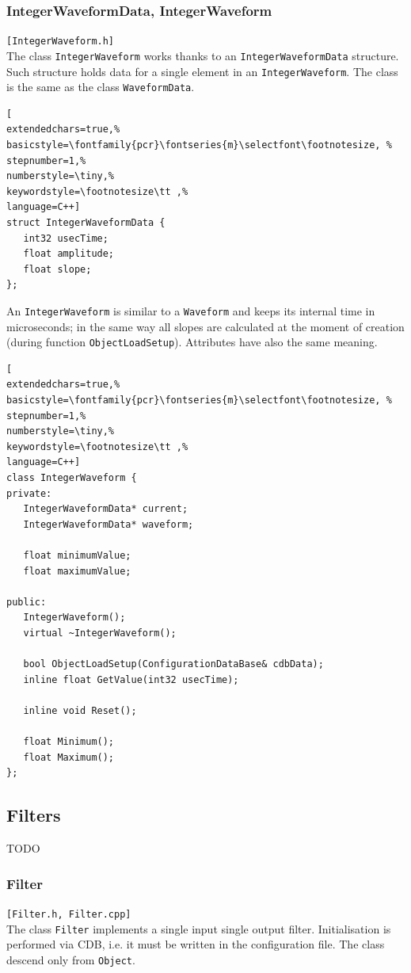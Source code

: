 \subsubsection{IntegerWaveformData, IntegerWaveform}
\texttt{[IntegerWaveform.h]}\\
The class \texttt{IntegerWaveform} works thanks to an \texttt{IntegerWaveformData} structure. Such structure holds data for a single element in an \texttt{IntegerWaveform}.
The class is the same as the class \texttt{WaveformData}.

\begin{lstlisting}[
extendedchars=true,%
basicstyle=\fontfamily{pcr}\fontseries{m}\selectfont\footnotesize, %
stepnumber=1,%
numberstyle=\tiny,%
keywordstyle=\footnotesize\tt ,%
language=C++]
struct IntegerWaveformData {
   int32 usecTime;
   float amplitude;
   float slope;
};
\end{lstlisting}

An \texttt{IntegerWaveform} is similar to a \texttt{Waveform} and keeps its internal time in microseconds; in the same way all slopes are calculated at the moment of creation (during function \texttt{ObjectLoadSetup}). Attributes have also the same meaning.

\begin{lstlisting}[
extendedchars=true,%
basicstyle=\fontfamily{pcr}\fontseries{m}\selectfont\footnotesize, %
stepnumber=1,%
numberstyle=\tiny,%
keywordstyle=\footnotesize\tt ,%
language=C++]
class IntegerWaveform {
private:
   IntegerWaveformData* current;
   IntegerWaveformData* waveform;
   
   float minimumValue;
   float maximumValue;

public:
   IntegerWaveform();
   virtual ~IntegerWaveform();

   bool ObjectLoadSetup(ConfigurationDataBase& cdbData);
   inline float GetValue(int32 usecTime);

   inline void Reset();

   float Minimum();
   float Maximum();
};
\end{lstlisting}



\subsection{Filters}

TODO

\subsubsection{Filter}
\texttt{[Filter.h, Filter.cpp]}\\
The class \texttt{Filter} implements a single input single output filter. Initialisation is performed via CDB, i.e. it must be written in the configuration file. The class descend only from \texttt{Object}.

